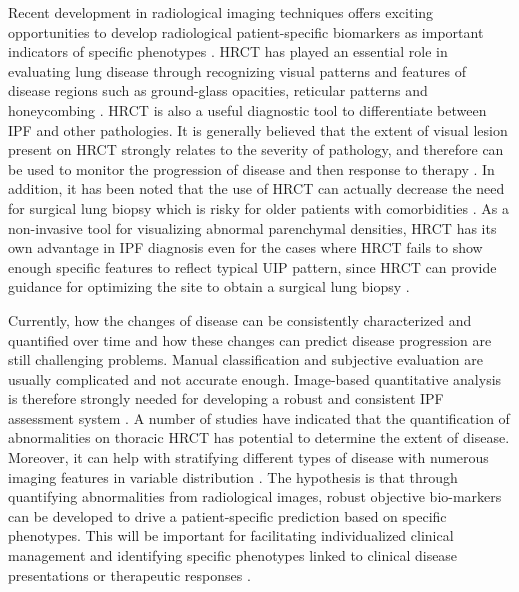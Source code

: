 Recent development in radiological imaging techniques offers exciting opportunities to develop radiological patient-specific biomarkers as important indicators of specific phenotypes \citep{devaraj2014imaging,gotway2007challenges}. HRCT has played an essential role in evaluating lung disease through recognizing visual patterns and features of disease regions such as ground-glass opacities, reticular patterns and honeycombing \citep{mueller2007every}. HRCT is also a useful diagnostic tool to differentiate between IPF and other pathologies. It is generally believed that the extent of visual lesion present on HRCT strongly relates to the severity of pathology, and therefore can be used to monitor the progression of disease and then response to therapy \citep{kazerooni1997thin,kim1999nonspecific,wells2003idiopathic,saketkoo2011developing}. In addition, it has been noted that the use of HRCT can actually decrease the need for surgical lung biopsy which is risky for older patients with comorbidities \citep{bartholmai2013quantitative}. As a non-invasive tool for visualizing abnormal parenchymal densities, HRCT has its own advantage in IPF diagnosis even for the cases where HRCT fails to show enough specific features to reflect typical UIP pattern, since HRCT can provide guidance for optimizing the site to obtain a surgical lung biopsy \citep{kazerooni2001high, diette2005high, misumi2006idiopathic, costabel2007diffuse}. 

Currently, how the changes of disease can be consistently characterized and quantified over time and how these changes can predict disease progression are still challenging problems. Manual classification and subjective evaluation are usually complicated and not accurate enough. Image-based quantitative analysis is therefore strongly needed for developing a robust and consistent IPF assessment system \citep{gotway2007challenges,lynch2005high}. A number of studies have indicated that the quantification of abnormalities on thoracic HRCT has potential to determine the extent of disease. Moreover, it can help with stratifying different types of disease with numerous imaging features in variable distribution \citep{best2008idiopathic,wells2003idiopathic, sumikawa2008computed, bartholmai2013quantitative}. The hypothesis is that through quantifying abnormalities from radiological images, robust objective bio-markers can be developed to drive a patient-specific prediction based on specific phenotypes. This will be important for facilitating individualized clinical management and identifying specific phenotypes linked to clinical disease presentations or therapeutic responses \citep{raghunath2014quantitative}.
\newpage

